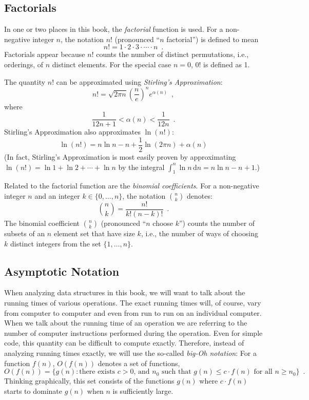 \subsection{Factorials}

In one or two places in this book, the \emph{factorial} function is used.
For a non-negative integer $n$, the notation $n!$ (pronounced ``$n$ factorial'') is defined to mean 
\[
   n! = 1\cdot2\cdot3\cdot\cdots\cdot n \enspace .
\]
Factorials appear because $n!$ counts the number of distinct
permutations, i.e., orderings, of $n$ distinct elements.  For the special case $n=0$, $0!$ is defined as 1. 

The quantity $n!$ can be approximated using \emph{Stirling's Approximation}:
\[
	n! 
   = \sqrt{2\pi n}\left(\frac{n}{e}\right)^{n}e^{\alpha(n)} \enspace ,
\]
where
\[  
   \frac{1}{12n+1} <  \alpha(n) < \frac{1}{12n}  \enspace .
\]
Stirling's Approximation also approximates $\ln(n!)$:
\[
   \ln(n!) = n\ln n - n + \frac{1}{2}\ln(2\pi n) + \alpha(n)
\]
(In fact, Stirling's Approximation is most easily proven by approximating
$\ln(n!)=\ln 1 + \ln 2  + \cdots + \ln n$ by the integral
$\int_1^n \ln n\,\mathrm{d}n = n\ln n - n +1$.)

Related to the factorial function are the \emph{binomial coefficients}.
For a non-negative integer $n$ and an integer $k\in\{0,\ldots,n\}$,
the notation $\binom{n}{k}$ denotes:
\[
   \binom{n}{k} = \frac{n!}{k!(n-k)!} \enspace .
\]
The binomial coefficient $\binom{n}{k}$ (pronounced ``$n$ choose $k$'')
counts the number of subsets of an $n$ element set that have size $k$,
i.e., the number of ways of choosing $k$ distinct integers from the
set $\{1,\ldots,n\}$.

\subsection{Asymptotic Notation}

When analyzing data structures in this book, we will want to talk about
the running times of various operations.  The exact running times will,
of course, vary from computer to computer and even from run to run on an
individual computer.  When we talk about the running time of an operation
we are referring to the number of computer instructions performed during
the operation.  Even for simple code, this quantity can be difficult to compute exactly.
Therefore, instead of analyzing running times
exactly, we will use the so-called \emph{big-Oh notation}: For a 
function $f(n)$, $O(f(n))$ denotes a set of functions,
\[
   O(f(n)) = \{g(n):\mbox{there exists $c>0$, and $n_0$ such that
             $g(n) \le c\cdot f(n)$ for all $n\ge n_0$}   \} \enspace .
\]
Thinking graphically, this set consists of the functions $g(n)$ where
$c\cdot f(n)$ starts to dominate $g(n)$ when $n$ is sufficiently large.

